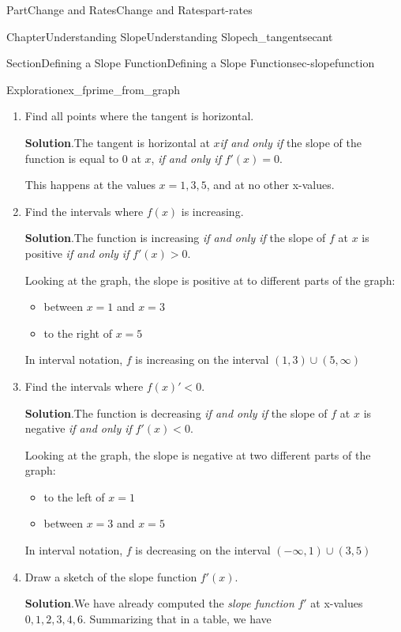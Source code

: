 \documentclass[oneside,10pt,]{tufte-book}
\newcommand{\blocktitlefont}{\relax}
\numberwithin{equation}{chapter}
\newcommand{\lt}{<}
\newcommand{\gt}{>}
\begin{document}
\begin{partptx}{Part}{Change and Rates}{}{Change and Rates}{}{}{part-rates}
\begin{chapterptx}{Chapter}{Understanding Slope}{}{Understanding Slope}{}{}{ch_tangentsecant}
\begin{sectionptx}{Section}{Defining a Slope Function}{}{Defining a Slope Function}{}{}{sec-slopefunction}
\begin{exploration}{Exploration}{}{ex_fprime_from_graph}
\begin{enumerate}[font=\bfseries,label=(\alph*),ref=\alph*]
%
\item{}Find all points where the tangent is horizontal.%
\par\smallskip%
\noindent\textbf{\blocktitlefont Solution}.\hypertarget{ex_fprime_from_graph-3-2}{}\quad{}The tangent is horizontal at \(x\)\emph{if and only if} the slope of the function is equal to 0 at \(x\), \emph{if and only if} \(f'(x) = 0\).%
\par
This happens at the values \(x=1,3,5\), and at no other x-values.%
\item{}Find the intervals where \(f(x)\) is increasing.%
\par\smallskip%
\noindent\textbf{\blocktitlefont Solution}.\hypertarget{ex_fprime_from_graph-4-2}{}\quad{}The function is increasing \emph{if and only if} the slope of \(f\) at \(x\) is positive \emph{if and only if} \(f'(x)\gt 0\).%
\par
Looking at the graph, the slope is positive at to different parts of the graph:%
\begin{itemize}[label=\textbullet]
\item{}between \(x=1\) and \(x=3\)%
\item{}to the right of \(x=5\)%
\end{itemize}
In interval notation,  \(f\) is increasing on the interval \((1,3)\cup (5,\infty)\)%
\item{}Find the intervals where \(f(x)'\lt 0\).%
\par\smallskip%
\noindent\textbf{\blocktitlefont Solution}.\hypertarget{ex_fprime_from_graph-5-2}{}\quad{}The function is decreasing \emph{if and only if} the slope of \(f\) at \(x\) is negative \emph{if and only if} \(f'(x)\lt 0\).%
\par
Looking at the graph, the slope is negative at two different parts of the graph:%
\begin{itemize}[label=\textbullet]
\item{}to the left of \(x=1\)%
\item{}between \(x=3\) and \(x=5\)%
\end{itemize}
In interval notation,  \(f\) is decreasing on the interval \((-\infty,1)\cup (3,5)\)%
\item{}Draw a sketch of the slope function \(f'(x)\).%
\par\smallskip%
\noindent\textbf{\blocktitlefont Solution}.\hypertarget{ex_fprime_from_graph-6-2}{}\quad{}We have already computed the \emph{slope function} \(f'\) at x-values \(0,1,2,3,4,6\).  Summarizing that in a table, we have \begin{center}%

\end{center}
\end{enumerate}
\end{exploration}
\end{sectionptx}
\end{chapterptx}
\end{partptx}
\end{document}

